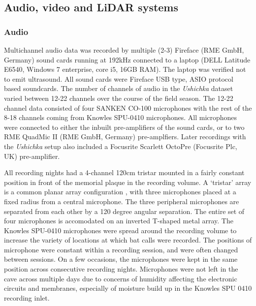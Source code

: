 \documentclass[
]{book}
\begin{document}
\hypertarget{audio-video-and-lidar-systems}{%
\subsection{Audio, video and LiDAR systems}\label{audio-video-and-lidar-systems}}

\hypertarget{audio}{%
\subsubsection{Audio}\label{audio}}

Multichannel audio data was recorded by multiple (2-3) Fireface (RME GmbH, Germany) sound cards running at 192kHz connected to a laptop (DELL Latitude E6540, Windows 7 enterprise, core i5, 16GB RAM). The laptop was verified not to emit ultrasound. All sound cards were Fireface USB type, ASIO protocol based soundcards. The number of channels of audio in the \emph{Ushichka} dataset varied between 12-22 channels over the course of the field season. The 12-22 channel data consisted of four SANKEN CO-100 microphones with the rest of the 8-18 channels coming from Knowles SPU-0410 microphones. All microphones were connected to either the inbuilt pre-amplifiers of the sound cards, or to two RME QuadMic II (RME GmbH, Germany) pre-amplfiers. Later recordings with the \emph{Ushichka} setup also included a Focusrite Scarlett OctoPre (Focusrite Plc, UK) pre-amplifier.

All recording nights had a 4-channel 120cm tristar mounted in a fairly constant position in front of the memorial plaque in the recording volume. A `tristar' array is a common planar array configuration \citep{Hugel2017, Goerlitz2010, Lewanzik2018}, with three microphones placed at a fixed radius from a central microphone. The three peripheral microphones are separated from each other by a 120 degree angular separation. The entire set of four microphones is accomodated on an inverted T-shaped metal array. The Knowles SPU-0410 microphones were spread around the recording volume to increase the variety of locations at which bat calls were recorded. The positions of microphone were constant within a recording session, and were often changed between sessions. On a few occasions, the microphones were kept in the same position across consecutive recording nights. Microphones were not left in the cave across multiple days due to concerns of humidity affecting the electronic circuits and membranes, especially of moisture build up in the Knowles SPU 0410 recording inlet.
\end{document}
